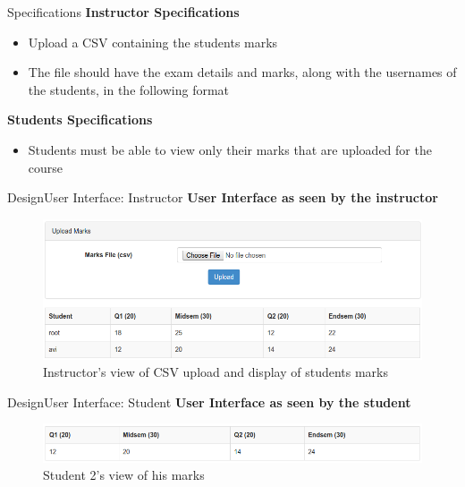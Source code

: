 \documentclass[xcolor=table]{beamer}
\begin{document}
\begin{frame}{Specifications}
	\textbf{Instructor Specifications}
	\begin{itemize}
		\item Upload a CSV containing the students marks
		\item The file should have the exam details and marks, along with the usernames of the students, in the following format
	\end{itemize}

	\textbf{Students Specifications}
	\begin{itemize}
		\item Students must be able to view only their marks that are uploaded for the course
	\end{itemize}
	
\end{frame}

\begin{frame}{Design}{User Interface: Instructor}
	\textbf{User Interface as seen by the instructor}
	\begin{figure}
		\centering
		\includegraphics[width=0.8\linewidth]{media/marksi}
		\caption{Instructor's view of CSV upload and display of students marks}
		\label{fig:marksi}
	\end{figure}
\end{frame}

\begin{frame}{Design}{User Interface: Student}
	\textbf{User Interface as seen by the student}
	\begin{figure}
		\centering
		\includegraphics[width=0.8\linewidth]{media/markss1}
		\caption{Student 2's view of his marks}
		\label{fig:markss1}
	\end{figure}
\end{frame}
\end{document}
